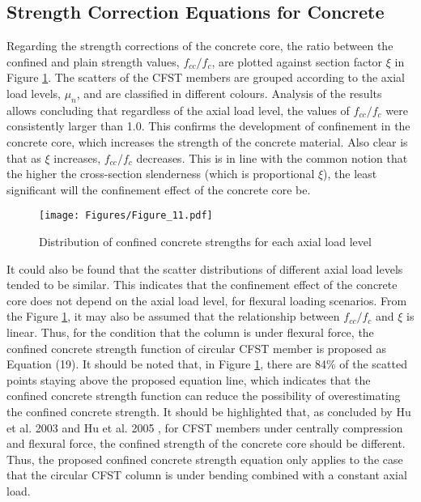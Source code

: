 \documentclass[12pt,a4]{article}
\begin{document}
	\subsection{Strength Correction Equations for Concrete}
	Regarding the strength corrections of the concrete core, the ratio between the confined and plain strength values, $f_{cc}/f_c$, are plotted against section factor $ξ$ in Figure \ref{fig-10}. The scatters of the CFST members are grouped according to the axial load levels, $μ_n$, and are classified in different colours. Analysis of the results allows concluding that regardless of the axial load level, the values of $f_{cc}/f_c$ were consistently larger than 1.0. This confirms the development of confinement in the concrete core, which increases the strength of the concrete material. Also clear is that as $ξ$ increases, $f_{cc}/f_c$ decreases. This is in line with the common notion that the higher the cross-section slenderness (which is proportional $ξ$), the least significant will the confinement effect of the concrete core be.
	\par
	\begin{figure}[h]
		\centering
		\texttt{[image: Figures/Figure\_11.pdf]}
		\caption{Distribution of confined concrete strengths for each axial load level}
		\label{fig-10}
	\end{figure}
	\par
	It could also be found that the scatter distributions of different axial load levels tended to be similar. This indicates that the confinement effect of the concrete core does not depend on the axial load level, for flexural loading scenarios. From the Figure \ref{fig-10}, it may also be assumed that the relationship between $f_{cc}/f_c$ and $ξ$ is linear. Thus, for the condition that the column is under flexural force, the confined concrete strength function of circular CFST member is proposed as Equation (19). It should be noted that, in Figure \ref{fig-10}, there are 84\% of the scatted points staying above the proposed equation line, which indicates that the confined concrete strength function can reduce the possibility of overestimating the confined concrete strength. It should be highlighted that, as concluded by Hu et al. 2003 \cite{RN1} and Hu et al. 2005 \cite{RN29}, for CFST members under centrally compression and flexural force, the confined strength of the concrete core should be different. Thus, the proposed confined concrete strength equation only applies to the case that the circular CFST column is under bending combined with a constant axial load.
\end{document}
